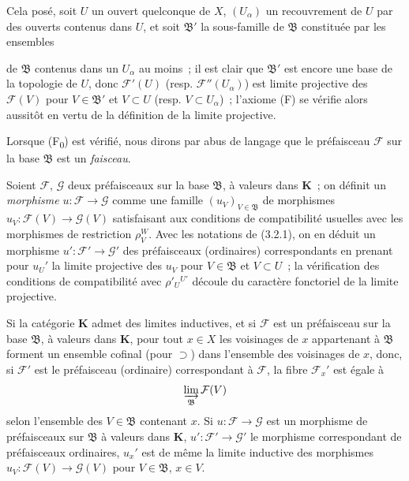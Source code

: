 \begin{env}[3.2.2]
Cela posé, soit $U$ un ouvert quelconque de $X$, $(U_\alpha)$ un recouvrement
de $U$ par des ouverts contenus dans $U$, et soit $\mathfrak{B}'$ la
sous-famille de $\mathfrak{B}$ constituée par les ensembles


de $\mathfrak{B}$ contenus dans un $U_\alpha$ au moins~; il est clair que
$\mathfrak{B}'$ est encore une base de la topologie de $U$, donc
$\mathcal{F}'(U)$ (resp. $\mathcal{F}''(U_\alpha)$) est limite projective des
$\mathcal{F}(V)$ pour $V\in\mathfrak{B}'$ et $V\subset U$ (resp.
$V\subset U_\alpha$)~; l'axiome (F) se vérifie alors aussitôt en vertu de la
définition de la limite projective.

Lorsque (F\textsubscript{0}) est vérifié, nous dirons par abus de langage que
le préfaisceau $\mathcal{F}$ sur la base $\mathfrak{B}$ est un \emph{faisceau}.
\end{env}

\begin{env}[3.2.3]
\label{0.3.2.3-fr}
Soient $\mathcal{F}$, $\mathcal{G}$ deux préfaisceaux sur la base
$\mathfrak{B}$, à valeurs dans $\mathbf{K}$~; on définit un \emph{morphisme}
$u:\mathcal{F}\to\mathcal{G}$ comme une famille
$(u_V)_{V\in\mathfrak{B}}$ de morphismes
$u_V:\mathcal{F}(V)\to\mathcal{G}(V)$ satisfaisant aux conditions de
compatibilité usuelles avec les morphismes de restriction $\rho_V^W$. Avec
les notations de (3.2.1), on en déduit un morphisme
$u':\mathcal{F}'\to\mathcal{G}'$ des préfaisceaux (ordinaires) correspondants
en prenant pour $u_U'$ la limite projective des $u_V$ pour
$V\in\mathfrak{B}$ et $V\subset U$~; la vérification des conditions de
compatibilité avec $\rho'_U{}^{U'}$ découle du caractère fonctoriel de la
limite projective.
\end{env}

\begin{env}[3.2.4]
\label{0.3.2.4-fr}
Si la catégorie $\mathbf{K}$ admet des limites inductives, et si $\mathcal{F}$
est un préfaisceau sur la base $\mathfrak{B}$, à valeurs dans $\mathbf{K}$,
pour tout $x\in X$ les voisinages de $x$ appartenant à $\mathfrak{B}$ forment
un ensemble cofinal (pour $\supset$) dans l'ensemble des voisinages de $x$,
donc, si $\mathcal{F}'$ est le préfaisceau (ordinaire) correspondant à
$\mathcal{F}$, la fibre $\mathcal{F}_x'$ est égale à
\[
  \varinjlim_{\mathfrak{B}}\mathcal{F}(V)
\]
selon l'ensemble des $V\in\mathfrak{B}$ contenant $x$.
Si $u:\mathcal{F}\to\mathcal{G}$ est un morphisme de préfaisceaux sur
$\mathfrak{B}$ à valeurs dans $\mathbf{K}$,
$u':\mathcal{F}'\to\mathcal{G}'$ le morphisme correspondant de préfaisceaux
ordinaires, $u_x'$ est de même la limite inductive des morphismes
$u_V:\mathcal{F}(V)\to\mathcal{G}(V)$ pour $V\in\mathfrak{B}$, $x\in V$.
\end{env}

